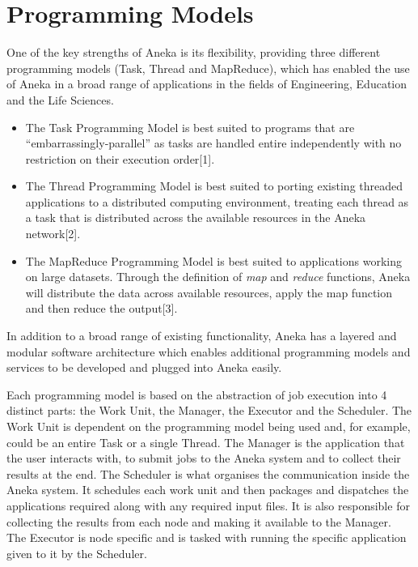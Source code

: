 \section{Programming Models}
One of the key strengths of Aneka is its flexibility, providing three different programming models (Task, Thread and MapReduce), which has enabled the use of Aneka in a broad range of applications in the fields of Engineering, Education and the Life Sciences.
\begin{itemize}
\item The Task Programming Model is best suited to programs that are ``embarrassingly-parallel'' as tasks are handled entire independently with no restriction on their execution order[1].

\item The Thread Programming Model is best suited to porting existing threaded applications to a distributed computing environment, treating each thread as a task that is distributed across the available resources in the Aneka network[2].

\item The MapReduce Programming Model is best suited to applications working on large datasets. Through the definition of \emph{map} and \emph{reduce} functions, Aneka will distribute the data across available resources, apply the map function and then reduce the output[3].
\end{itemize}

In addition to a broad range of existing functionality, Aneka has a layered and modular software architecture which enables additional programming models and services to be developed and plugged into Aneka easily.

Each programming model is based on the abstraction of job execution into 4 distinct parts: the Work Unit, the Manager, the Executor and the Scheduler. The Work Unit is dependent on the programming model being used and, for example, could be an entire Task or a single Thread. The Manager is the application that the user interacts with, to submit jobs to the Aneka system and to collect their results at the end. The Scheduler is what organises the communication inside the Aneka system. It schedules each work unit and then packages and dispatches the applications required along with any required input files. It is also responsible for collecting the results from each node and making it available to the Manager. The Executor is node specific and is tasked with running the specific application given to it by the Scheduler\cite{Aneka}.

